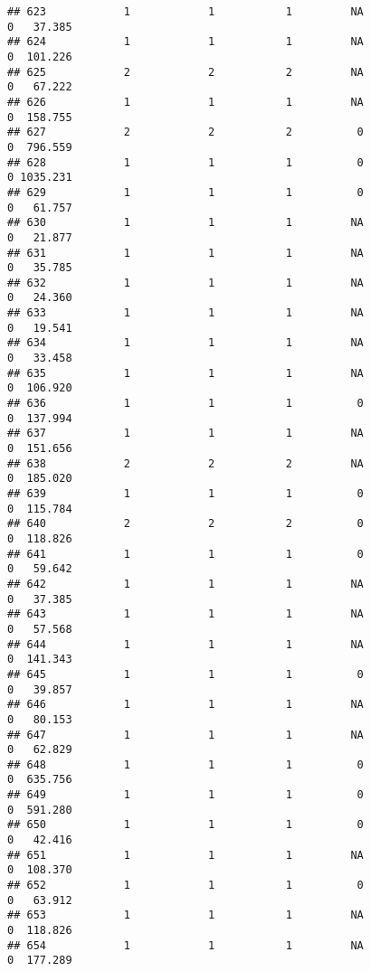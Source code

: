 \documentclass[
]{article}
\begin{document}
\begin{verbatim}
## 623            1            1           1         NA                0   37.385
## 624            1            1           1         NA                0  101.226
## 625            2            2           2         NA                0   67.222
## 626            1            1           1         NA                0  158.755
## 627            2            2           2          0                0  796.559
## 628            1            1           1          0                0 1035.231
## 629            1            1           1          0                0   61.757
## 630            1            1           1         NA                0   21.877
## 631            1            1           1         NA                0   35.785
## 632            1            1           1         NA                0   24.360
## 633            1            1           1         NA                0   19.541
## 634            1            1           1         NA                0   33.458
## 635            1            1           1         NA                0  106.920
## 636            1            1           1          0                0  137.994
## 637            1            1           1         NA                0  151.656
## 638            2            2           2         NA                0  185.020
## 639            1            1           1          0                0  115.784
## 640            2            2           2          0                0  118.826
## 641            1            1           1          0                0   59.642
## 642            1            1           1         NA                0   37.385
## 643            1            1           1         NA                0   57.568
## 644            1            1           1         NA                0  141.343
## 645            1            1           1          0                0   39.857
## 646            1            1           1         NA                0   80.153
## 647            1            1           1         NA                0   62.829
## 648            1            1           1          0                0  635.756
## 649            1            1           1          0                0  591.280
## 650            1            1           1          0                0   42.416
## 651            1            1           1         NA                0  108.370
## 652            1            1           1          0                0   63.912
## 653            1            1           1         NA                0  118.826
## 654            1            1           1         NA                0  177.289

\end{verbatim}
\end{document}
